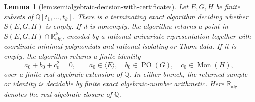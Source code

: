 \documentclass{article}
\newtheorem{lemma}{Lemma}
\begin{document}
\begin{lemma}[lem:semialgebraic-decision-with-certificates]\label{lem:semialgebraic-decision-with-certificates}
Let \(E,G,H\) be finite subsets of \(\mathbb Q[t_1,\ldots,t_k]\).  There is a terminating exact algorithm deciding whether \(S(E,G,H)\) is empty.  If it is nonempty, the algorithm returns a point in \(S(E,G,H)\cap\mathbb R_{\mathrm{alg}}^k\), encoded by a rational univariate representation together with coordinate minimal polynomials and rational isolating or Thom data.  If it is empty, the algorithm returns a finite identity
\[
 a_0+b_0+c_0^2=0,
 \qquad
 a_0\in\langle E\rangle,
 \quad b_0\in\operatorname{PO}(G),
 \quad c_0\in\operatorname{Mon}(H),
\]
over a finite real algebraic extension of \(\mathbb Q\).  In either branch, the returned sample or identity is decidable by finite exact algebraic-number arithmetic.  Here \(\mathbb R_{\mathrm{alg}}\) denotes the real algebraic closure of \(\mathbb Q\).
\end{lemma}
\end{document}
